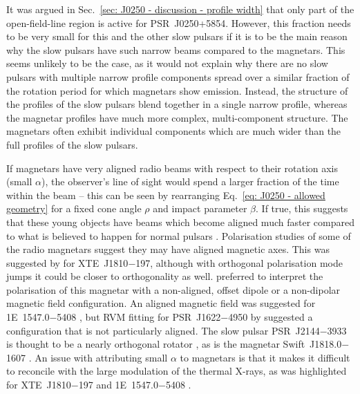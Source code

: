 It was argued in Sec.~\ref{sec: J0250 - discussion - profile width} that only part of the open-field-line region is active for PSR~J0250+5854. However, this fraction needs to be very small for this and the other slow pulsars if it is to be the main reason why the slow pulsars have such narrow beams compared to the magnetars. This seems unlikely to be the case, as it would not explain why there are no slow pulsars with multiple narrow profile components spread over a similar fraction of the rotation period for which magnetars show emission. Instead, the structure of the profiles of the slow pulsars blend together in a single narrow profile, whereas the magnetar profiles have much more complex, multi-component structure. The magnetars often exhibit individual components which are much wider than the full profiles of the slow pulsars.

If magnetars have very aligned radio beams with respect to their rotation axis (small $\alpha$), the observer's line of sight would spend a larger fraction of the time within the beam -- this can be seen by rearranging Eq.~\eqref{eq: J0250 - allowed geometry} for a fixed cone angle $\rho$ and impact parameter $\beta$. If true, this suggests that these young objects have beams which become aligned much faster compared to what is believed to happen for normal pulsars \citep{TMxx1998,WJxx2008}. Polarisation studies of some of the radio magnetars suggest they may have aligned magnetic axes. This was suggested by \citet{CCR+2007} for XTE~J1810$-$197, although with orthogonal polarisation mode jumps it could be closer to orthogonality as well. \citet{KSJ+2007} preferred to interpret the polarisation of this magnetar with a non-aligned, offset dipole or a non-dipolar magnetic field configuration. An aligned magnetic field was suggested for 1E~1547.0$-$5408 \citep{CRJ+2008}, but RVM fitting for PSR~J1622$-$4950 by \citet{LBB+2012} suggested a configuration that is not particularly aligned. The slow pulsar PSR~J2144$-$3933 is thought to be a nearly orthogonal rotator \citep{MBMA2020}, as is the magnetar Swift~J1818.0$-$1607 \citep{LJS+2021}. An issue with attributing small $\alpha$ to magnetars is that it makes it difficult to reconcile with the large modulation of the thermal X-rays, as was highlighted for XTE~J1810$-$197 \citep{GHxx2007,PGxx2008} and 1E~1547.0$-$5408 \citep{IER+2010}.

